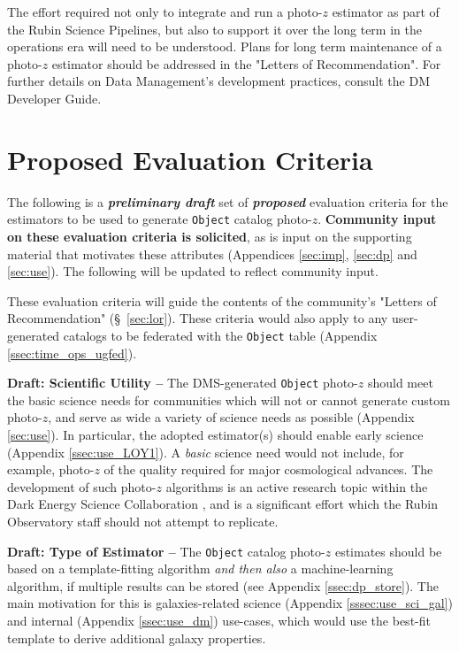 \documentclass[DM,lsstdraft,toc]{lsstdoc}
\begin{document}
The effort required not only to integrate and run a photo-$z$ estimator as part of the Rubin Science Pipelines, but also to support it over the long term in the operations era will need to be understood. 
Plans for long term maintenance of a photo-$z$ estimator should be addressed in the "Letters of Recommendation". 
For further details on Data Management's development practices, consult the DM Developer Guide. \cite{DevGuide} 


\section{Proposed Evaluation Criteria} \label{sec:eval}

The following is a \textbf{\textit{preliminary draft}} set of \textbf{\textit{proposed}} evaluation criteria for the estimators to be used to generate  {\tt Object} catalog photo-$z$.
\textbf{Community input on these evaluation criteria is solicited}, as is input on the supporting material that motivates these attributes (Appendices \ref{sec:imp}, \ref{sec:dp} and \ref{sec:use}).
The following will be updated to reflect community input.

These evaluation criteria will guide the contents of the community's "Letters of Recommendation" (\S~\ref{sec:lor}).
These criteria would also apply to any user-generated catalogs to be federated with the {\tt Object} table (Appendix \ref{ssec:time_ops_ugfed}).

{\bf Draft: Scientific Utility --}
The DMS-generated {\tt Object} photo-$z$ should meet the basic science needs for communities which will not or cannot generate custom photo-$z$, and serve as wide a variety of science needs as possible (Appendix \ref{sec:use}).
In particular, the adopted estimator(s) should enable early science (Appendix \ref{ssec:use_LOY1}).
A {\it basic} science need would not include, for example, photo-$z$ of the quality required for major cosmological advances.
The development of such photo-$z$ algorithms is an active research topic within the Dark Energy Science Collaboration \citep{2018arXiv180901669T}, and is a significant effort which the Rubin Observatory staff should not attempt to replicate. 

{\bf Draft: Type of Estimator --} 
The {\tt Object} catalog photo-$z$ estimates should be based on a template-fitting algorithm {\it and then also} a machine-learning algorithm, if multiple results can be stored (see Appendix \ref{ssec:dp_store}).
The main motivation for this is galaxies-related science (Appendix \ref{sssec:use_sci_gal}) and internal (Appendix \ref{ssec:use_dm}) use-cases, which would use the best-fit template to derive additional galaxy properties.
\end{document}
